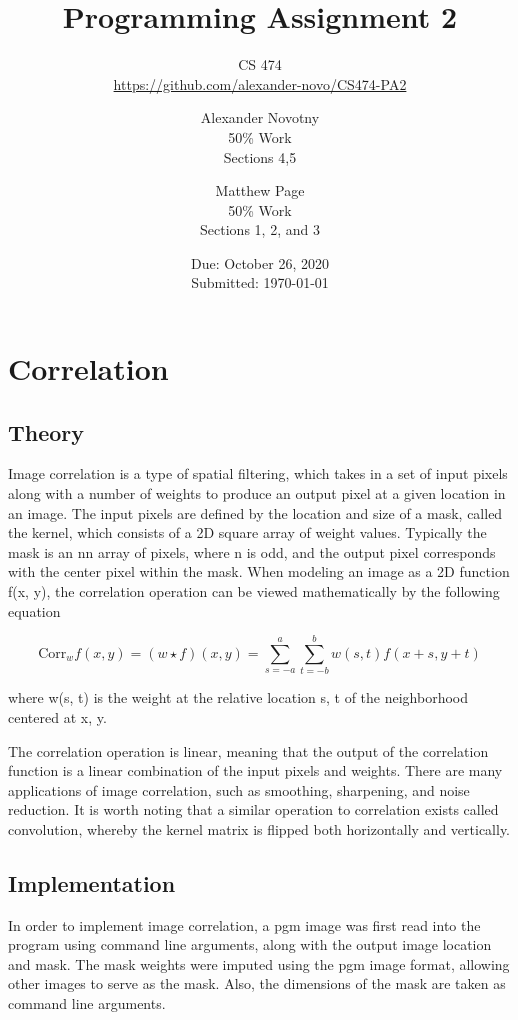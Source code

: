 \documentclass[headings=optiontoheadandtoc,listof=totoc,parskip=full]{scrartcl}
\title{Programming Assignment 2}
\subtitle{CS 474\\\url{https://github.com/alexander-novo/CS474-PA2}}
\author{Alexander Novotny\\50\% Work\\Sections 4,5 \and Matthew Page\\50\% Work\\Sections 1, 2, and 3}
\date{Due: October 26, 2020 \\ Submitted: \today}
\begin{document}
\maketitle
\tableofcontents
{}

\newpage
{}

\section{Correlation}
\label{sec:correlation}

\subsection{Theory}

Image correlation is a type of spatial filtering, which takes in a set of input pixels along with a number of weights to produce an output pixel at a given location in an image. The input pixels are defined by the location and size of a mask, called the kernel, which consists of a 2D square array of weight values. Typically the mask is an nn array of pixels, where n is odd, and the output pixel corresponds with the center pixel within the mask. When modeling an image as a 2D function f(x, y), the correlation operation can be viewed mathematically by the following equation

\[\text{Corr}_w f(x, y) = (w \star f)(x, y) = \sum_{s=-a}^a \sum_{t=-b}^b w(s, t) f(x+s, y+t)\]

where w(s, t) is the weight at the relative location s, t of the neighborhood centered at x, y.

The correlation operation is linear, meaning that the output of the correlation function is a linear combination of the input pixels and weights. There are many applications of image correlation, such as smoothing, sharpening, and noise reduction. It is worth noting that a similar operation to correlation exists called convolution, whereby the kernel matrix is flipped both horizontally and vertically. 


\subsection{Implementation}

In order to implement image correlation, a pgm image was first read into the program using command line arguments, along with the output image location and mask. The mask weights were imputed using the pgm image format, allowing other images to serve as the mask. Also, the dimensions of the mask are taken as command line arguments. 
\end{document}
